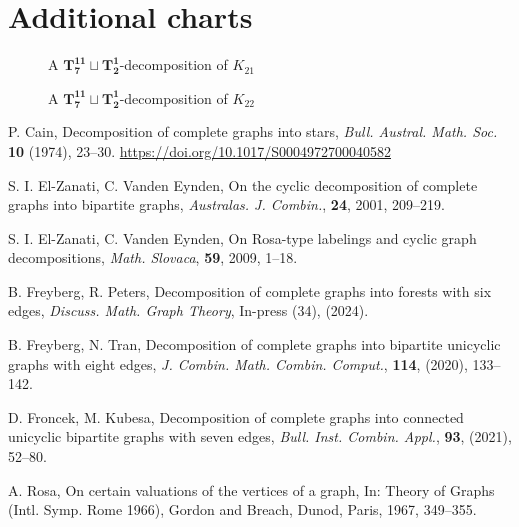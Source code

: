 \chapter{Additional charts}


\newpage

\newpage
    \begin{figure}[H]
        
        \caption{A $\mathbf{T_{7}^{11}}\sqcup\mathbf{T_{2}^{1}}$-decomposition of $K_{21}$}
        \label{fig:K21}
    \end{figure}
    \begin{figure}[H]
        
        \caption{A $\mathbf{T_{7}^{11}}\sqcup\mathbf{T_{2}^{1}}$-decomposition of $K_{22}$}
        \label{fig:K22}
    \end{figure}
    
    \begin{thebibliography}{20}
    
    P. Cain, 
    Decomposition of complete graphs into stars, 
    \textit{Bull. Austral. Math. Soc.} \textbf{10} (1974), 23--30.
    \url{https://doi.org/10.1017/S0004972700040582}
    
    S. I. El-Zanati, C. Vanden Eynden,
    On the cyclic decomposition of complete graphs into bipartite graphs,
    \textit{Australas. J. Combin.}, \textbf{24}, 2001, 209--219.
    
    S. I. El-Zanati, C. Vanden Eynden,
    On Rosa-type labelings and cyclic graph decompositions,
    \textit{Math. Slovaca}, \textbf{59}, 2009, 1--18.
    
    B. Freyberg, R. Peters, 
    Decomposition of complete graphs into forests with six edges, 
    \textit{Discuss. Math. Graph Theory}, In-press (34), (2024).
    
    B. Freyberg, N. Tran, 
    Decomposition of complete graphs into bipartite unicyclic graphs with eight edges, 
    \textit{J. Combin. Math. Combin. Comput.}, \textbf{114}, (2020), 133--142.
    
    D. Froncek, M. Kubesa, 
    Decomposition of complete graphs into connected unicyclic bipartite graphs with seven edges,
    \textit{Bull. Inst. Combin. Appl.}, \textbf{93}, (2021), 52--80.
    
    A. Rosa,
    On certain valuations of the vertices of a graph,
    In: Theory of Graphs (Intl. Symp. Rome 1966), Gordon and Breach, Dunod, Paris,
    1967, 349--355.
    
    \end{thebibliography}